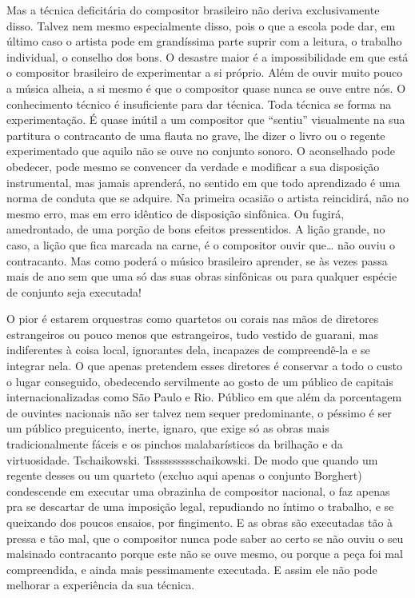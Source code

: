 Mas a técnica deficitária do compositor brasileiro não deriva
exclusivamente disso. Talvez nem mesmo especialmente disso, pois o que a
escola pode dar, em último caso o artista pode em grandíssima parte
suprir com a leitura, o trabalho individual, o conselho dos bons. O
desastre maior é a impossibilidade em que está o compositor brasileiro
de experimentar a si próprio. Além de ouvir muito pouco a música alheia,
a si mesmo é que o compositor quase nunca se ouve entre nós. O
conhecimento técnico é insuficiente para dar técnica. Toda técnica se
forma na experimentação. É quase inútil a um compositor que ``sentiu''
visualmente na sua partitura o contracanto de uma flauta no grave, lhe
dizer o livro ou o regente experimentado que aquilo não se ouve no
conjunto sonoro. O aconselhado pode obedecer, pode mesmo se convencer da
verdade e modificar a sua disposição instrumental, mas jamais aprenderá,
no sentido em que todo aprendizado é uma norma de conduta que se
adquire. Na primeira ocasião o artista reincidirá, não no mesmo erro,
mas em erro idêntico de disposição sinfônica. Ou fugirá, amedrontado, de
uma porção de bons efeitos pressentidos. A lição grande, no caso, a
lição que fica marcada na carne, é o compositor ouvir que\ldots{} não ouviu o
contracanto. Mas como poderá o músico brasileiro aprender, se às vezes
passa mais de ano sem que uma só das suas obras sinfônicas ou para
qualquer espécie de conjunto seja executada!

O pior é estarem orquestras como quartetos ou corais nas mãos de
diretores estrangeiros ou pouco menos que estrangeiros, tudo vestido de
guarani, mas indiferentes à coisa local, ignorantes dela, incapazes de
compreendê-la e se integrar nela. O que apenas pretendem esses diretores
é conservar a todo o custo o lugar conseguido, obedecendo servilmente ao
gosto de um público de capitais internacionalizadas como São Paulo e
Rio. Público em que além da porcentagem de ouvintes nacionais não ser
talvez nem sequer predominante, o péssimo é ser um público preguicento,
inerte, ignaro, que exige só as obras mais tradicionalmente fáceis e os
pinchos malabarísticos da brilhação e da virtuosidade. Tschaikowski.
Tsssssssssschaikowski. De modo que quando um regente desses ou um
quarteto (excluo aqui apenas o conjunto Borghert) condescende em
executar uma obrazinha de compositor nacional, o faz apenas pra se
descartar de uma imposição legal, repudiando no íntimo o trabalho, e se
queixando dos poucos ensaios, por fingimento. E as obras são executadas
tão à pressa e tão mal, que o compositor nunca pode saber ao certo se
não ouviu o seu malsinado contracanto porque este não se ouve mesmo, ou
porque a peça foi mal compreendida, e ainda mais pessimamente executada.
E assim ele não pode melhorar a experiência da sua técnica.

